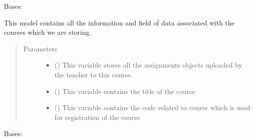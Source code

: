 \documentclass[letterpaper,10pt,english]{sphinxmanual}
\begin{document}
\begin{fulllineitems}
\label{\detokenize{users:users.models.courses}}
\sphinxAtStartPar
Bases: 

\sphinxAtStartPar
This model contains all the information and field of data associated with the courses which we are storing.
\begin{quote}\begin{description}
\item[{Parameters}] \leavevmode\begin{itemize}
\item {} 
\sphinxAtStartPar
{} (\sphinxstyleliteralemphasis{\sphinxupquote{)}}) \textendash{} This variable stores all the assignments objects uploaded by the teacher to this course.

\item {} 
\sphinxAtStartPar
{} () \textendash{} This variable contains the title of the course

\item {} 
\sphinxAtStartPar
{} () \textendash{} This variable contains the code related to course which is used for registration of the course

\end{itemize}

\end{description}\end{quote}

\begin{fulllineitems}
\label{\detokenize{users:users.models.courses.DoesNotExist}}
\sphinxAtStartPar
Bases: 


\end{fulllineitems}
\end{fulllineitems}
\end{document}
